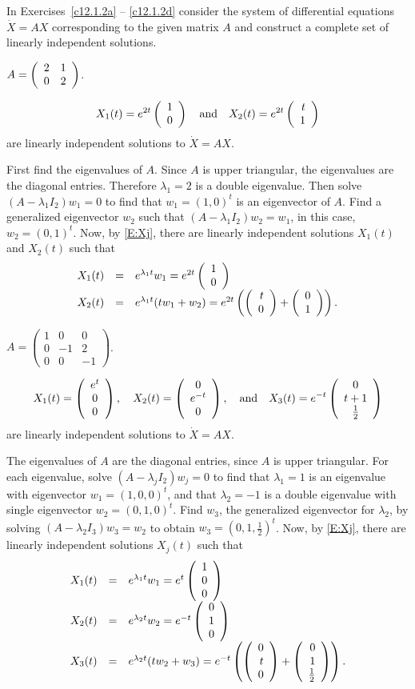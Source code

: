 \documentclass{ximera}
\begin{document}
\noindent  In Exercises~\ref{c12.1.2a} -- \ref{c12.1.2d} consider the system 
of differential equations $\dot X = AX$ corresponding to the given matrix 
$A$ and construct a complete set of linearly independent solutions.
\begin{exercise} \label{c12.1.2a}
$A=\left(\begin{array}{rr} 2 & 1\\ 0 &2\end{array}\right)$.

\begin{solution}
\ans
\[
X_1(t) = e^{2t}\left(\begin{array}{r} 1 \\ 0\end{array}\right) \quad\mbox{and}\quad
X_2(t) = e^{2t}\left(\begin{array}{r} t \\ 1\end{array}\right)
\]
are linearly independent solutions to $\dot{X} = AX$.

\soln First find the eigenvalues of $A$.  Since $A$ is upper triangular,
the eigenvalues are the diagonal entries.  Therefore $\lambda_1 = 2$
is a double eigenvalue.  Then solve $(A - \lambda_1 I_2)w_1 = 0$ to
find that $w_1 = (1,0)^t$ is an eigenvector of $A$.  Find a
generalized eigenvector $w_2$ such that $(A - \lambda_1 I_2)w_2 =
w_1$, in this case, $w_2 = (0,1)^t$.  Now, by \eqref{E:Xj},
there are linearly independent solutions $X_1(t)$ and $X_2(t)$ such that
\[
\begin{array}{rcl}
X_1(t) & = & e^{\lambda_1 t}w_1 = e^{2t}\left(\begin{array}{r} 1 \\ 0\end{array}\right) \\ X_2(t) & = &
e^{\lambda_1 t}(tw_1 + w_2) = e^{2t}\left(\left(\begin{array}{r} t \\ 0\end{array}\right) +
\left(\begin{array}{r} 0 \\ 1\end{array}\right)\right).
\end{array}
\]

\end{solution}
\end{exercise}
\begin{exercise} \label{c12.1.2b}
$A=\left(\begin{array}{rrr} 1 & 0 & 0\\ 0 & -1 & 2 \\ 0 & 0 & -1
\end{array}\right)$.

\begin{solution}
\ans
\[
X_1(t) = \left(\begin{array}{c} e^t \\ 0 \\ 0\end{array}\right), \quad
X_2(t) = \left(\begin{array}{c} 0 \\ e^{-t} \\ 0\end{array}\right), \quad\mbox{and}\quad
X_3(t) = e^{-t}\left(\begin{array}{c} 0 \\ t + 1 \\ \frac{1}{2}\end{array}\right)
\]
are linearly independent solutions to $\dot{X} = AX$.

\soln The eigenvalues of $A$ are the diagonal entries, since $A$ is upper
triangular.  For each eigenvalue, solve $(A - \lambda_j I_2)w_j = 0$
to find that $\lambda_1 = 1$ is an eigenvalue with eigenvector $w_1 =
(1,0,0)^t$, and that $\lambda_2 = -1$ is a double eigenvalue with
single eigenvector $w_2 = (0,1,0)^t$.  Find $w_3$, the generalized
eigenvector for $\lambda_2$, by solving $(A - \lambda_2 I_3)w_3 = w_2$
to obtain $w_3 = (0,1,\frac{1}{2})^t$.  Now, by \eqref{E:Xj},
there are linearly independent solutions $X_j(t)$ such that
\[
\begin{array}{rcl}
X_1(t) & = & e^{\lambda_1 t}w_1 = e^t\left(\begin{array}{r} 1 \\ 0 \\ 0\end{array}\right) \\
X_2(t) & = & e^{\lambda_2 t}w_2 = e^{-t}\left(\begin{array}{r} 0 \\ 1 \\ 0\end{array}\right) \\
X_3(t) & = & e^{\lambda_2 t}(tw_2 + w_3) = e^{-t}\left(\left(\begin{array}{r} 0 \\ t \\ 0\end{array}\right)
+ \left(\begin{array}{r} 0 \\ 1 \\ \frac{1}{2}\end{array}\right)\right).
\end{array}
\]

\end{solution}
\end{exercise}
\end{document}
